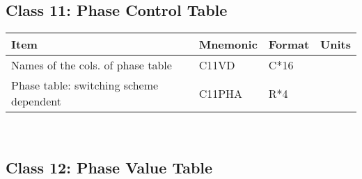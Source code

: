                                                                                 

\subsection{Class 11: Phase Control Table}


\begin{tabular}{||l|l|l|l||} \hline
Item                                    & Mnemonic & Format & Units \\ \hline
Names of the cols. of phase table       & C11VD    & C*16   &  ~    \\      
Phase table: switching scheme dependent & C11PHA   & R*4    &  ~    \\ \hline
\end{tabular}
 \\




\subsection{Class 12: Phase Value Table}


